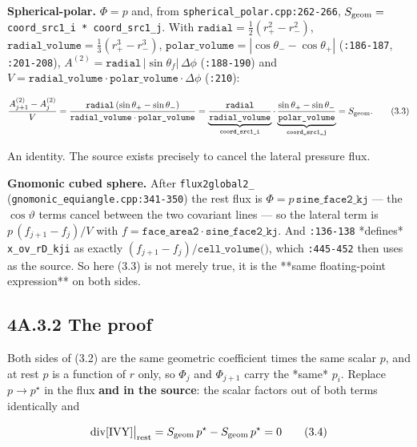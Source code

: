 \documentclass[11pt,a4paper]{article}
\begin{document}
\textbf{Spherical-polar.} $\Phi=p$ and, from \texttt{spherical\_polar.cpp:262-266},
$S_{\rm geom}=$ \texttt{coord\_src1\_i * coord\_src1\_j}. With
$\texttt{radial}=\tfrac12(r_+^2-r_-^2)$,
$\texttt{radial\_volume}=\tfrac13(r_+^3-r_-^3)$,
$\texttt{polar\_volume}=|\cos\theta_-\!-\!\cos\theta_+|$ (\texttt{:186-187}, \texttt{:201-208}),
$A^{(2)}=\texttt{radial}\,|\sin\theta_f|\,\Delta\phi$ (\texttt{:188-190}) and
$V=\texttt{radial\_volume}\cdot\texttt{polar\_volume}\cdot\Delta\phi$ (\texttt{:210}):

\begin{equation*}
\frac{A^{(2)}_{j+1}-A^{(2)}_j}{V}
=\frac{\texttt{radial}\,(\sin\theta_+-\sin\theta_-)}{\texttt{radial\_volume}\cdot\texttt{polar\_volume}}
=\underbrace{\frac{\texttt{radial}}{\texttt{radial\_volume}}}_{\texttt{coord\_src1\_i}}
\cdot\underbrace{\frac{\sin\theta_+-\sin\theta_-}{\texttt{polar\_volume}}}_{\texttt{coord\_src1\_j}}
= S_{\rm geom}.
\tag{3.3}
\end{equation*}

An identity. The source exists precisely to cancel the lateral pressure flux.

\textbf{Gnomonic cubed sphere.} After \texttt{flux2global2\_}
(\texttt{gnomonic\_equiangle.cpp:341-350}) the rest flux is
$\Phi=p\,\texttt{sine\_face2\_kj}$ — the $\cos\vartheta$ terms cancel between
the two covariant lines — so the lateral term is $p\,(f_{j+1}-f_j)/V$ with
$f=\texttt{face\_area2}\cdot\texttt{sine\_face2\_kj}$. And \texttt{:136-138} *defines*
\texttt{x\_ov\_rD\_kji} as exactly $(f_{j+1}-f_j)/\texttt{cell\_volume()}$, which \texttt{:445-452}
then uses as the source. So here (3.3) is not merely true, it is the **same
floating-point expression** on both sides.

\subsection*{4A.3.2 The proof}

Both sides of (3.2) are the same geometric coefficient times the same scalar
$p$, and at rest $p$ is a function of $r$ only, so $\Phi_j$ and $\Phi_{j+1}$
carry the *same* $p_i$. Replace $p\to p^\star$ in the flux \textbf{and in the source}:
the scalar factors out of both terms identically and

\begin{equation*}
\mathrm{div}[{\rm IVY}]\big|_{\rm rest}
= S_{\rm geom}\,p^\star - S_{\rm geom}\,p^\star = 0
\tag{3.4}
\end{equation*}
\end{document}
